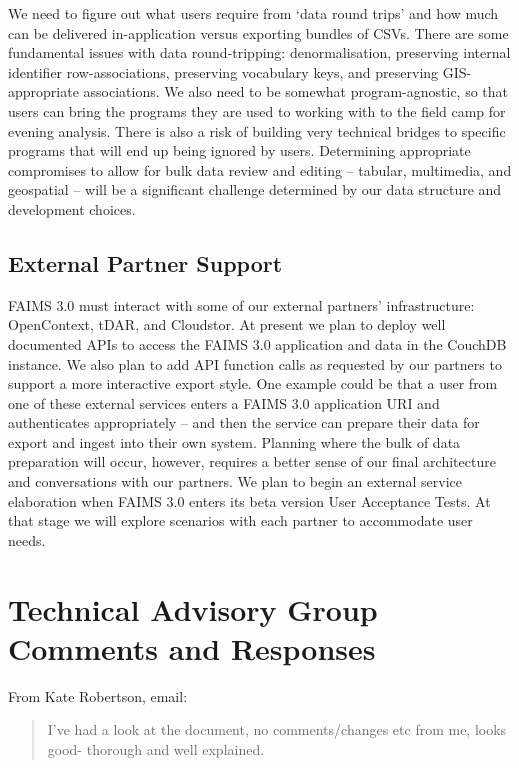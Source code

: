 \documentclass[a4paper,headings=small fontsize=10pt]{scrreprt}
\begin{document}
We need to figure out what users require from `data round trips' and how
much can be delivered in-application versus exporting bundles of CSVs.
There are some fundamental issues with data round-tripping:
denormalisation, preserving internal identifier row-associations,
preserving vocabulary keys, and preserving GIS-appropriate associations.
We also need to be somewhat program-agnostic, so that users can bring
the programs they are used to working with to the field camp for evening
analysis. There is also a risk of building very technical bridges to
specific programs that will end up being ignored by users. Determining
appropriate compromises to allow for bulk data review and editing --
tabular, multimedia, and geospatial -- will be a significant challenge
determined by our data structure and development choices.

\section{External Partner Support}

FAIMS 3.0 must interact with some of our external partners'
infrastructure: OpenContext, tDAR, and Cloudstor. At present we plan to
deploy well documented APIs to access the FAIMS 3.0 application and data
in the CouchDB instance. We also plan to add API function calls as
requested by our partners to support a more interactive export style.
One example could be that a user from one of these external services
enters a FAIMS 3.0 application URI and authenticates appropriately --
and then the service can prepare their data for export and ingest into
their own system. Planning where the bulk of data preparation will
occur, however, requires a better sense of our final architecture and
conversations with our partners. We plan to begin an external service
elaboration when FAIMS 3.0 enters its beta version User Acceptance
Tests. At that stage we will explore scenarios with each partner to
accommodate user needs.

\printbibliography


\chapter{Technical Advisory Group
Comments and Responses}

From Kate Robertson, email:
\begin{quote}
I've had a look at the document, no comments/changes etc from me, looks
good- thorough and well explained.
\end{quote}
\end{document}
